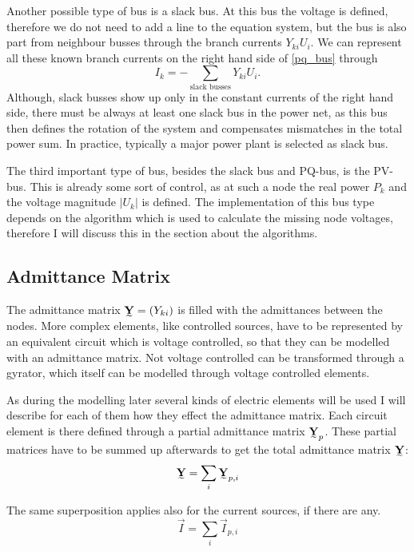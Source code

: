 Another possible type of bus is a slack bus. At this bus the voltage is defined, therefore we do not need to add a line to the equation system, but the bus is also part from neighbour busses through the branch currents $Y_{ki} U_i$. We can represent all these known branch currents on the right hand side of \eqref{pq_bus} through
\begin{equation}
	I_k = -\sum_{\text{slack busses}} Y_{ki} U_i.
\end{equation}
Although, slack busses show up only in the constant currents of the right hand side, there must be always at least one slack bus in the power net, as this bus then defines the rotation of the system and compensates mismatches in the total power sum. In practice, typically a major power plant is selected as slack bus.

The third important type of bus, besides the slack bus and PQ-bus, is the PV-bus. This is already some sort of control, as at such a node the real power $P_k$ and the voltage magnitude $|U_k|$ is defined. The implementation of this bus type depends on the algorithm which is used to calculate the missing node voltages, therefore I will discuss this in the section about the algorithms.

\subsection{Admittance Matrix}

The admittance matrix $\mat Y = (Y_{ki})$ is filled with the admittances between the nodes. More complex elements, like controlled sources, have to be represented by an equivalent circuit which is voltage controlled, so that they can be modelled with an admittance matrix. Not voltage controlled can be transformed through a gyrator, which itself can be modelled through voltage controlled elements.

As during the modelling later several kinds of electric elements will be used I will describe for each of them how they effect the admittance matrix. Each circuit element is there defined through a partial admittance matrix $\mat Y_p$. These partial matrices have to be summed up afterwards to get the total admittance matrix $\mat Y$:
\begin{equation}
	\mat Y = \sum_i \mat Y_{p,i}
\end{equation}

The same superposition applies also for the current sources, if there are any.
\begin{equation}
	\vec I = \sum_i \vec I_{p,i}
\end{equation}

